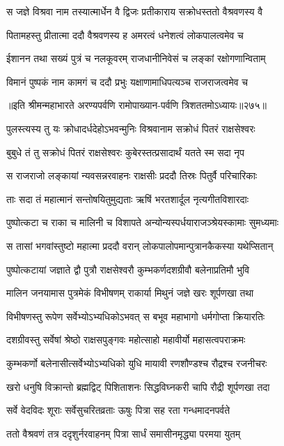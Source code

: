 \twolineshloka
{स जज्ञे विश्रवा नाम तस्यात्मार्धेन वै द्विजः}
{प्रतीकाराय सक्रोधस्ततो वैश्रवणस्य वै}


\twolineshloka
{पितामहस्तु प्रीतात्मा ददौ वैश्रवणस्य ह}
{अमरत्वं धनेशत्वं लोकपालत्वमेव च}


\twolineshloka
{ईशानन तथा सख्यं पुत्रं च नलकूवरम्}
{राजधानीनिवेसं च लङ्कां रक्षोगणान्विताम्}


\twolineshloka
{विमानं पुष्पकं नाम कामगं च ददौ प्रभुः}
{यक्षाणामाधिपत्यञ्च राजराजत्वमेव च}


॥इति श्रीमन्महाभारते अरण्यपर्वणि रामोपाख्यान-पर्वणि त्रिशततमोऽध्यायः॥२७५॥



\twolineshloka
{पुलस्त्यस्य तु यः क्रोधादर्धदेहोऽभवन्मुनिः}
{विश्रवानाम सक्रोधं पितरं राक्षसेश्वरः}


\twolineshloka
{बुबुधे तं तु सक्रोधं पितरं राक्षसेश्वरः}
{कुबेरस्तत्प्रसादार्थं यतते स्म सदा नृप}


\twolineshloka
{स राजराजो लङ्कायां न्यवसन्नरवाहनः}
{राक्षसीः प्रददौ तिस्रः पितुर्वै परिचारिकाः}


\twolineshloka
{ताः सदा तं महात्मानं सन्तोषयितुमुद्यताः}
{ऋषिं भरतशार्दूल नृत्यगीतविशारदाः}


\twolineshloka
{पुष्पोत्कटा च राका च मालिनी च विशापते}
{अन्योन्यस्पर्धयाराजञ्श्रेयस्कामाः सुमध्यमाः}


\twolineshloka
{स तासां भगवांस्तुष्टो महात्मा प्रददौ वरान्}
{लोकपालोपमान्पुत्रानकैकस्या यथेप्सितान्}


\twolineshloka
{पुष्पोत्कटायां जज्ञाते द्वौ पुत्रौ राक्षसेश्वरौ}
{कुम्भकर्णदशग्रीवौ बलेनाप्रतिमौ भुवि}


\twolineshloka
{मालिन जनयामास पुत्रमेकं विभीषणम्}
{राकार्या मिथुनं जज्ञे खरः शूर्पणखा तथा}


\twolineshloka
{विभीषणस्तु रूपेण सर्वेभ्योऽभ्यधिकोऽभवत्}
{स बभूव महाभागो धर्मगोप्ता क्रियारतिः}


\twolineshloka
{दशग्रीवस्तु सर्वेषां श्रेष्ठो राक्षसपुङ्गवः}
{महोत्साहो महावीर्यो महासत्वपराक्रमः}


\twolineshloka
{कुम्भकर्णो बलेनासीत्सर्वेभ्योऽभ्यधिको युधि}
{मायावी रणशौण्डश्च रौद्रश्च रजनीचरः}


\twolineshloka
{खरो धनुषि विक्रान्तो ब्रह्मद्विट् पिशिताशनः}
{सिद्धविघ्नकरी चापि रौद्री शूर्पणखा तदा}


\twolineshloka
{सर्वे वेदविदः शूराः सर्वेसुचरितव्रताः}
{ऊषुः पित्रा सह रता गन्धमादनपर्वते}


\twolineshloka
{ततो वैश्रवणं तत्र ददृशुर्नरवाहनम्}
{पित्रा सार्धं समासीनमृद्ध्या परमया युतम्}


